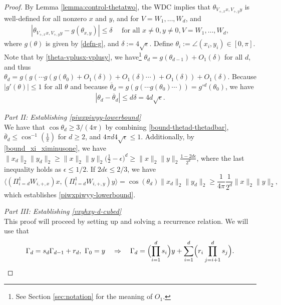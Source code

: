 \documentclass[11pt]{article}
\newcommand{\eps}{\epsilon}
\newcommand{\thetabar}{\overline{\theta}}
\newcommand{\PiWd}{\Pi_{i=d}^1 W_{i,+,x}}
\newcommand{\PiWdy}{\Pi_{i=d}^1 W_{i,+,y}}
\newcommand{\Vpx}{V_{+,x}}
\newcommand{\Vpy}{V_{+,y}}
\begin{document}
\begin{proof}
By Lemma \ref{lemma:control-thetatwo}, the WDC implies that $\theta_{\Vpx x, \Vpy y}$ is well-defined for all nonzero $x$ and $y$, and for $V = W_1, \ldots, W_d$, and
\begin{align}
| \theta_{\Vpx x, \Vpy y} - g(\theta_{x,y})| \leq \delta \quad \text{ for all } x\neq0, y\neq 0, V = W_1, \ldots, W_d, \label{theta-vplusx-vplusy}
\end{align}
where $g(\theta)$ is given by \eqref{defn-g},  and $\delta := 4 \sqrt{\eps}$.  
  Define $\theta_{i} :=\angle (x_{i}, y_{i}) \in [0, \pi]$.  
Note that by \eqref{theta-vplusx-vplusy}, we have\footnote{See Section \ref{sec:notation} for the meaning of $O_1$.}  $\theta_d = g(\theta_{d-1}) + O_1(\delta)$ for all $d$, and thus
$\theta_d = g(g(\cdots g(g(\theta_0) + O_1(\delta) ) +O_1(\delta)  \cdots) + O_1(\delta))   + O_1(\delta)$. Because $|g'(\theta)| \leq 1$ for all $\theta$ and because $\thetabar_d = g(g(\cdots g(\theta_0)\cdots)) = g^{\circ d} (\theta_0)$, we have
\begin{align}
|\theta_d - \overline{\theta}_d | \leq d \delta = 4 d \sqrt{\eps}. \label{bound-thetad-thetadbar}
\end{align}

\textit{Part II: Establishing \eqref{piwxpiwyy-lowerbound}}\\
We have that $\cos \theta_d \geq 3/(4 \pi)$ by combining \eqref{bound-thetad-thetadbar},  $\thetabar_d \leq \cos^{-1}(\frac{1}{\pi})$ for $d \geq 2$,  and $4 \pi d 4 \sqrt{\eps} \leq 1$.  Additionally, by \eqref{bound_xi_ximinusone}, we have $\|x_d\|_2 \|y_d\|_2 \geq \|x\|_2 \|y\|_2 \bigl( \frac{1}{2} - \eps  \bigr)^d \geq  \|x\|_2 \|y\|_2 \frac{1 - 2 d \eps}{2^d}$, where the last inequality holds as $\eps \leq 1/2$. If $2 d \eps \leq 2/3$, we have 
\[
\bigl \langle  (\PiWd) x, ( \PiWdy) y \bigr \rangle  = \cos(\theta_d) \|x_d\|_2 \|y_d\|_2 \geq \frac{1}{4 \pi} \frac{1}{2^d} \|x\|_2 \|y\|_2,
\]
which establishes \eqref{piwxpiwyy-lowerbound}.

\textit{Part III: Establishing \eqref{vxyhxy-d-cubed}}\\
This proof will proceed by setting up and solving a recurrence relation.  We will use that  
\begin{align}
\Gamma_d = s_d \Gamma_{d-1} + r_d, \ \Gamma_0 = y \quad \Rightarrow \quad \Gamma_d = \Bigl(\prod_{i=1}^d s_i \Bigr) y + \sum_{i=1}^d \Bigr( r_i \prod_{j = i+1}^d s_j \Bigr). \label{recurrence-relation}
\end{align}


\end{proof}
\end{document}
